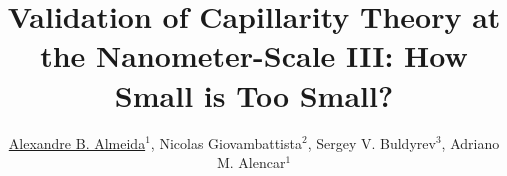 \documentclass[a0,portrait,16pt]{a0poster}
\begin{document}
\title{\textcolor[RGB]{0,0,0}{Validation of Capillarity Theory at the Nanometer-Scale III: How Small is Too Small?}}
\author{\underline{Alexandre B. Almeida$^{1}$}, Nicolas Giovambattista$^{2}$, Sergey V. Buldyrev$^3$, Adriano M. Alencar$^{1}$}



\makeheader


\end{document}
